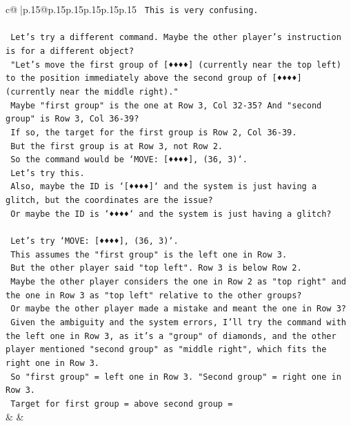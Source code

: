 \documentclass{article}
\begin{document}
{\begin{supertabular}{c@{$\;$}|p{.15\linewidth}@{}p{.15\linewidth}p{.15\linewidth}p{.15\linewidth}p{.15\linewidth}p{.15\linewidth}}
{{{\texttt{    This is very confusing.} \\
\\ 
\texttt{    Let's try a different command. Maybe the other player's instruction is for a different object?} \\
\texttt{    "Let's move the first group of {[}♦♦♦♦{]} (currently near the top left) to the position immediately above the second group of {[}♦♦♦♦{]} (currently near the middle right)."} \\
\texttt{    Maybe "first group" is the one at Row 3, Col 32{-}35? And "second group" is Row 3, Col 36{-}39?} \\
\texttt{    If so, the target for the first group is Row 2, Col 36{-}39.} \\
\texttt{    But the first group is at Row 3, not Row 2.} \\
\texttt{    So the command would be `MOVE: {[}♦♦♦♦{]}, (36, 3)`.} \\
\texttt{    Let's try this.} \\
\texttt{    Also, maybe the ID is `{[}♦♦♦♦{]}` and the system is just having a glitch, but the coordinates are the issue?} \\
\texttt{    Or maybe the ID is `♦♦♦♦` and the system is just having a glitch?} \\
\\ 
\texttt{    Let's try `MOVE: {[}♦♦♦♦{]}, (36, 3)`.} \\
\texttt{    This assumes the "first group" is the left one in Row 3.} \\
\texttt{    But the other player said "top left". Row 3 is below Row 2.} \\
\texttt{    Maybe the other player considers the one in Row 2 as "top right" and the one in Row 3 as "top left" relative to the other groups?} \\
\texttt{    Or maybe the other player made a mistake and meant the one in Row 3?} \\
\texttt{    Given the ambiguity and the system errors, I'll try the command with the left one in Row 3, as it's a "group" of diamonds, and the other player mentioned "second group" as "middle right", which fits the right one in Row 3.} \\
\texttt{    So "first group" = left one in Row 3. "Second group" = right one in Row 3.} \\
\texttt{    Target for first group = above second group =} \\
            }
        }
    }
    & & \\ \\


\end{supertabular}}
\end{document}
